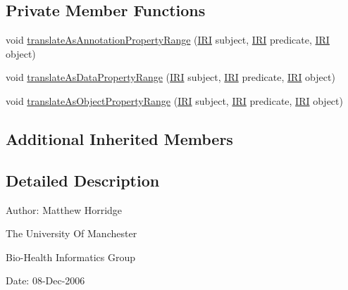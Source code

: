 \subsection*{Private Member Functions}
\begin{DoxyCompactItemize}
\item 
void \hyperlink{classorg_1_1coode_1_1owlapi_1_1rdfxml_1_1parser_1_1_t_p_property_range_handler_ae4b008ebde93bf15e7c60beb0c45dc9d}{translate\-As\-Annotation\-Property\-Range} (\hyperlink{classorg_1_1semanticweb_1_1owlapi_1_1model_1_1_i_r_i}{I\-R\-I} subject, \hyperlink{classorg_1_1semanticweb_1_1owlapi_1_1model_1_1_i_r_i}{I\-R\-I} predicate, \hyperlink{classorg_1_1semanticweb_1_1owlapi_1_1model_1_1_i_r_i}{I\-R\-I} object)
\item 
void \hyperlink{classorg_1_1coode_1_1owlapi_1_1rdfxml_1_1parser_1_1_t_p_property_range_handler_ad52bc2575af41ddd2fbe95e4b0998457}{translate\-As\-Data\-Property\-Range} (\hyperlink{classorg_1_1semanticweb_1_1owlapi_1_1model_1_1_i_r_i}{I\-R\-I} subject, \hyperlink{classorg_1_1semanticweb_1_1owlapi_1_1model_1_1_i_r_i}{I\-R\-I} predicate, \hyperlink{classorg_1_1semanticweb_1_1owlapi_1_1model_1_1_i_r_i}{I\-R\-I} object)
\item 
void \hyperlink{classorg_1_1coode_1_1owlapi_1_1rdfxml_1_1parser_1_1_t_p_property_range_handler_aaf3b3affdd06bb662c72b552a46667cb}{translate\-As\-Object\-Property\-Range} (\hyperlink{classorg_1_1semanticweb_1_1owlapi_1_1model_1_1_i_r_i}{I\-R\-I} subject, \hyperlink{classorg_1_1semanticweb_1_1owlapi_1_1model_1_1_i_r_i}{I\-R\-I} predicate, \hyperlink{classorg_1_1semanticweb_1_1owlapi_1_1model_1_1_i_r_i}{I\-R\-I} object)
\end{DoxyCompactItemize}
\subsection*{Additional Inherited Members}


\subsection{Detailed Description}
Author\-: Matthew Horridge\par
 The University Of Manchester\par
 Bio-\/\-Health Informatics Group\par
 Date\-: 08-\/\-Dec-\/2006\par
\par
 

